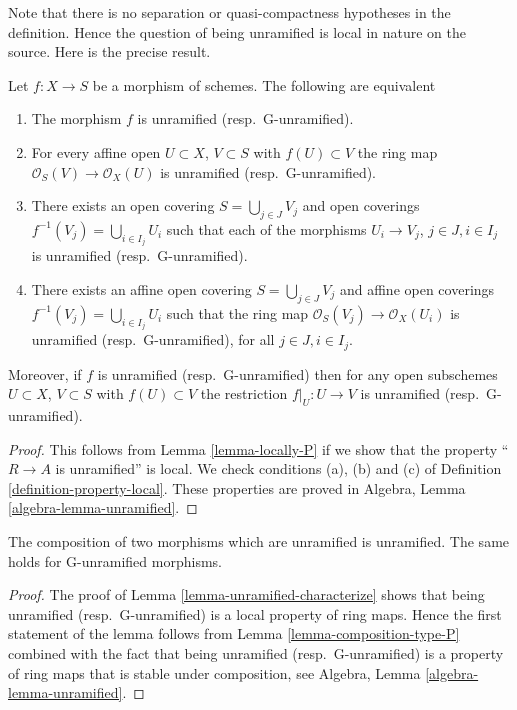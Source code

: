\noindent
Note that there is no separation or quasi-compactness hypotheses in the
definition. Hence the question of being unramified is local in nature on
the source. Here is the precise result.

\begin{lemma}
\label{lemma-unramified-characterize}
Let $f : X \to S$ be a morphism of schemes.
The following are equivalent
\begin{enumerate}
\item The morphism $f$ is unramified (resp.\ G-unramified).
\item For every affine open $U \subset X$, $V \subset S$
with $f(U) \subset V$ the ring map
$\mathcal{O}_S(V) \to \mathcal{O}_X(U)$ is unramified (resp.\ G-unramified).
\item There exists an open covering $S = \bigcup_{j \in J} V_j$
and open coverings $f^{-1}(V_j) = \bigcup_{i \in I_j} U_i$ such
that each of the morphisms $U_i \to V_j$, $j\in J, i\in I_j$
is unramified (resp.\ G-unramified).
\item There exists an affine open covering $S = \bigcup_{j \in J} V_j$
and affine open coverings $f^{-1}(V_j) = \bigcup_{i \in I_j} U_i$ such
that the ring map $\mathcal{O}_S(V_j) \to \mathcal{O}_X(U_i)$ is
unramified (resp.\ G-unramified), for all $j\in J, i\in I_j$.
\end{enumerate}
Moreover, if $f$ is unramified (resp.\ G-unramified) then for
any open subschemes $U \subset X$, $V \subset S$ with $f(U) \subset V$
the restriction $f|_U : U \to V$ is unramified (resp.\ G-unramified).
\end{lemma}

\begin{proof}
This follows from Lemma \ref{lemma-locally-P} if we show that
the property ``$R \to A$ is unramified'' is local.
We check conditions (a), (b) and (c) of Definition
\ref{definition-property-local}.
These properties are proved in
Algebra, Lemma \ref{algebra-lemma-unramified}.
\end{proof}

\begin{lemma}
\label{lemma-composition-unramified}
The composition of two morphisms which are unramified is unramified.
The same holds for G-unramified morphisms.
\end{lemma}

\begin{proof}
The proof of Lemma \ref{lemma-unramified-characterize}
shows that being unramified (resp.\ G-unramified)
is a local property of ring maps.
Hence the first statement of the lemma follows from
Lemma \ref{lemma-composition-type-P} combined
with the fact that being unramified (resp.\ G-unramified)
is a property of ring maps that is stable under composition, see
Algebra, Lemma \ref{algebra-lemma-unramified}.
\end{proof}

